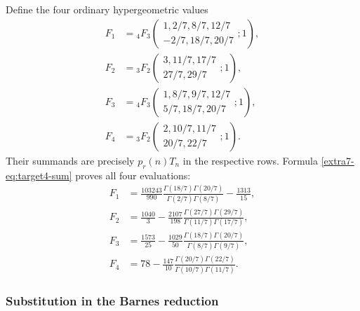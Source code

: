 \documentclass[11pt,a4paper]{article}
\theoremstyle{definition}
\theoremstyle{remark}
\numberwithin{equation}{section}
\begin{document}
Define the four ordinary hypergeometric values
\begin{align*}
 F_1&={}_4F_3\!\left(\begin{matrix}1,2/7,8/7,12/7\\-2/7,18/7,20/7\end{matrix};1\right),\\
 F_2&={}_3F_2\!\left(\begin{matrix}3,11/7,17/7\\27/7,29/7\end{matrix};1\right),\\
 F_3&={}_4F_3\!\left(\begin{matrix}1,8/7,9/7,12/7\\5/7,18/7,20/7\end{matrix};1\right),\\
 F_4&={}_3F_2\!\left(\begin{matrix}2,10/7,11/7\\20/7,22/7\end{matrix};1\right).
\end{align*}
Their summands are precisely $p_r(n)T_n$ in the respective rows. Formula
\eqref{extra7-eq:target4-sum} proves all four evaluations:
\begin{align*}
 F_1&=\frac{103243}{990}
       \frac{\Gamma(18/7)\Gamma(20/7)}{\Gamma(2/7)\Gamma(8/7)}
       -\frac{1313}{15},\\
 F_2&=\frac{1040}{3}-\frac{2107}{198}
       \frac{\Gamma(27/7)\Gamma(29/7)}{\Gamma(11/7)\Gamma(17/7)},\\
 F_3&=\frac{1573}{25}-\frac{1029}{50}
       \frac{\Gamma(18/7)\Gamma(20/7)}{\Gamma(8/7)\Gamma(9/7)},\\
 F_4&=78-\frac{147}{10}
       \frac{\Gamma(20/7)\Gamma(22/7)}{\Gamma(10/7)\Gamma(11/7)}.
\end{align*}

\subsubsection{Substitution in the Barnes reduction}
\end{document}
